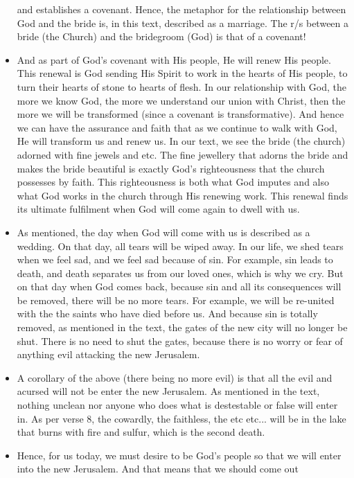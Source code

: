 \begin{itemize}
{  and establishes a covenant. Hence, the metaphor for the relationship
  between God and the bride is, in this text, described as a marriage. The
  r/s between a bride (the Church) and the bridegroom (God) is that of a
  covenant!}
  \item{And as part of God's covenant with His people, He will renew His
  people. This renewal is God sending His Spirit to work in the hearts of His
  people, to turn their hearts of stone to hearts of flesh. In our
  relationship with God, the more we know God, the more we understand our
  union with Christ, then the more we will be transformed (since a covenant
  is transformative). And hence we can have the assurance and faith that as
  we continue to walk with God, He will transform us and renew us. In our
  text, we see the bride (the church) adorned with fine jewels and etc. The
  fine jewellery that adorns the bride and makes the bride beautiful is
  exactly God's righteousness that the church possesses by faith. This
  righteousness is both what God imputes and also what God works in the
  church through His renewing work. This renewal finds its ultimate fulfilment when God will come again to dwell with us. }
  \item{As mentioned, the day when God will come with us is described as a
  wedding. On that day, all tears will be wiped away. In our life, we shed
  tears when we feel sad, and we feel sad because of sin. For example, sin
  leads to death, and death separates us from our loved ones, which is why we
  cry. But on that day when God comes back, because sin and all its
  consequences will be removed, there will be no more tears. For example, we
  will be re-united with the the saints who have died before us. And because
  sin is totally removed, as mentioned in the text, the gates of the new city
  will no longer be shut. There is no need to shut the gates, because there
  is no worry or fear of anything evil attacking the new Jerusalem. }
  \item{A corollary of the above (there being no more evil) is that all the
  evil and acursed will not be enter the new Jerusalem. As mentioned in the
  text, nothing unclean nor anyone who does what is destestable or false will
  enter in. As per verse $8$, the cowardly, the faithless, the etc etc...
  will be in the lake that burns with fire and sulfur, which is the second
  death.}
  \item{Hence, for us today, we must desire to be God's people so that we
  will enter into the new Jerusalem. And that means that we should come out
}
\end{itemize}
